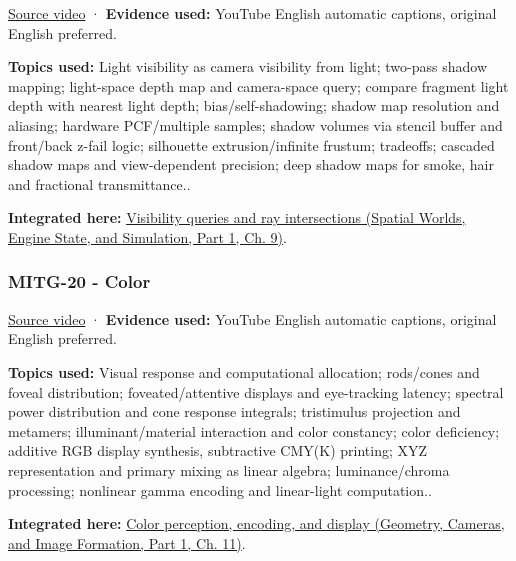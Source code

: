 \hypertarget{04-visual-computing-ii-ch036-mitg-19---shadow-maps}{}

\href{https://www.youtube.com/watch?v=jDw_EbXv-1I}{Source video} · \textbf{Evidence used:} YouTube English automatic captions, original English preferred.

\textbf{Topics used:} Light visibility as camera visibility from light; two-pass shadow mapping; light-space depth map and camera-space query; compare fragment light depth with nearest light depth; bias/self-shadowing; shadow map resolution and aliasing; hardware PCF/multiple samples; shadow volumes via stencil buffer and front/back z-fail logic; silhouette extrusion/infinite frustum; tradeoffs; cascaded shadow maps and view-dependent precision; deep shadow maps for smoke, hair and fractional transmittance..

\textbf{Integrated here:} \href{../05-Spatial-Worlds-Engine-State-and-Simulation-P01/main.pdf\#04-visual-computing-ii-ch028-visibility-queries-and-ray-intersections-1}{Visibility queries and ray intersections (Spatial Worlds, Engine State, and Simulation, Part 1, Ch. 9)}.

\subsubsection{MITG-20 - Color}\label{04-visual-computing-ii-ch036-mitg-20---color}

\hypertarget{04-visual-computing-ii-ch036-mitg-20---color}{}

\href{https://www.youtube.com/watch?v=aIVVBZ7cJBc}{Source video} · \textbf{Evidence used:} YouTube English automatic captions, original English preferred.

\textbf{Topics used:} Visual response and computational allocation; rods/cones and foveal distribution; foveated/attentive displays and eye-tracking latency; spectral power distribution and cone response integrals; tristimulus projection and metamers; illuminant/material interaction and color constancy; color deficiency; additive RGB display synthesis, subtractive CMY(K) printing; XYZ representation and primary mixing as linear algebra; luminance/chroma processing; nonlinear gamma encoding and linear-light computation..

\textbf{Integrated here:} \href{../03-Geometry-Cameras-and-Image-Formation-P01/main.pdf\#03-visual-computing-i-ch004-color-perception-encoding-and-display}{Color perception, encoding, and display (Geometry, Cameras, and Image Formation, Part 1, Ch. 11)}.

